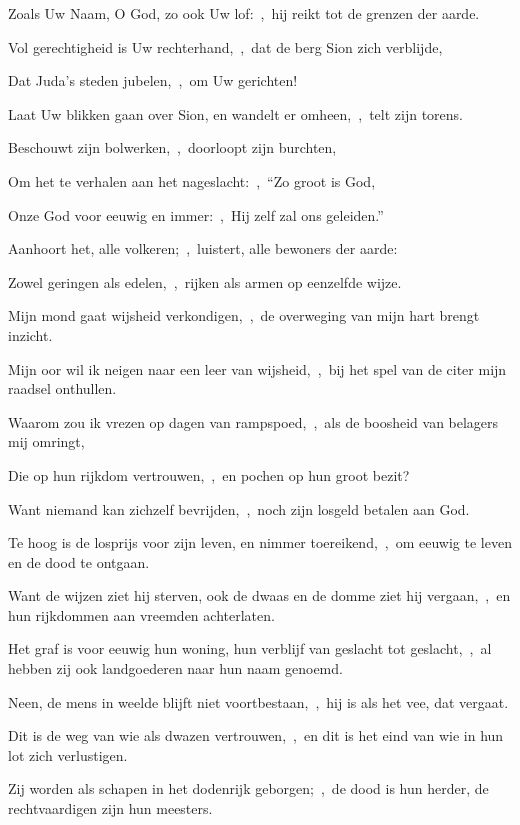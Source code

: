\documentclass[12pt,twoside,a5paper]{article}
\begin{document}
\begin{halfparskip}
  Zoals Uw Naam, O God, zo ook Uw lof:~\sep\ hij reikt tot de grenzen der aarde.

  Vol gerechtigheid is Uw rechterhand,~\sep\ dat de berg Sion zich verblijde,

  Dat Juda's steden jubelen,~\sep\ om Uw gerichten!

  Laat Uw blikken gaan over Sion, en wandelt er omheen,~\sep\ telt zijn torens.

  Beschouwt zijn bolwerken,~\sep\ doorloopt zijn burchten,

  Om het te verhalen aan het nageslacht:~\sep\ ``Zo groot is God,

  Onze God voor eeuwig en immer:~\sep\ Hij zelf zal ons geleiden.''

   Aanhoort het, alle volkeren;~\sep\ luistert, alle bewoners der aarde:

  Zowel geringen als edelen,~\sep\ rijken als armen op eenzelfde wijze.

  Mijn mond gaat wijsheid verkondigen,~\sep\ de overweging van mijn hart brengt inzicht.

  Mijn oor wil ik neigen naar een leer van wijsheid,~\sep\ bij het spel van de citer mijn raadsel onthullen.

  Waarom zou ik vrezen op dagen van rampspoed,~\sep\ als de boosheid van belagers mij omringt,

  Die op hun rijkdom vertrouwen,~\sep\ en pochen op hun groot bezit?

  Want niemand kan zichzelf bevrijden,~\sep\ noch zijn losgeld betalen aan God.

  Te hoog is de losprijs voor zijn leven, en nimmer toereikend,~\sep\ om eeuwig te leven en de dood te ontgaan.

  Want de wijzen ziet hij sterven, ook de dwaas en de domme ziet hij vergaan,~\sep\ en hun rijkdommen aan vreemden achterlaten.

  Het graf is voor eeuwig hun woning, hun verblijf van geslacht tot geslacht,~\sep\ al hebben zij ook landgoederen naar hun naam genoemd.

  Neen, de mens in weelde blijft niet voortbestaan,~\sep\ hij is als het vee, dat vergaat.

  Dit is de weg van wie als dwazen vertrouwen,~\sep\ en dit is het eind van wie in hun lot zich verlustigen.

  Zij worden als schapen in het dodenrijk geborgen;~\sep\ de dood is hun herder, de rechtvaardigen zijn hun meesters.


\end{halfparskip}
\end{document}

